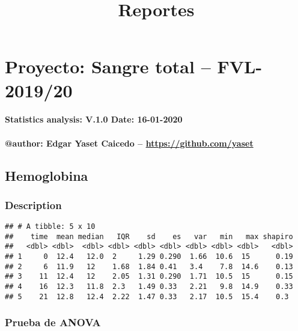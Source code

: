\documentclass[
]{article}
\title{Reportes}
\author{}
\date{\vspace{-2.5em}}
\begin{document}
\maketitle

\hypertarget{proyecto-sangre-total-fvl-201920}{%
\section{Proyecto: Sangre total --
FVL-2019/20}\label{proyecto-sangre-total-fvl-201920}}

\hypertarget{statistics-analysis-v.1.0-date-16-01-2020}{%
\paragraph{Statistics analysis: V.1.0 Date:
16-01-2020}\label{statistics-analysis-v.1.0-date-16-01-2020}}

\hypertarget{author-edgar-yaset-caicedo-httpsgithub.comyaset}{%
\paragraph{\texorpdfstring{@author: Edgar Yaset Caicedo --
\url{https://github.com/yaset}}{@author: Edgar Yaset Caicedo -- https://github.com/yaset}}\label{author-edgar-yaset-caicedo-httpsgithub.comyaset}}

\hypertarget{hemoglobina}{%
\subsection{Hemoglobina}\label{hemoglobina}}

\hypertarget{description}{%
\subsubsection{Description}\label{description}}

\begin{verbatim}
## # A tibble: 5 x 10
##    time  mean median   IQR    sd    es   var   min   max shapiro
##   <dbl> <dbl>  <dbl> <dbl> <dbl> <dbl> <dbl> <dbl> <dbl>   <dbl>
## 1     0  12.4   12.0  2     1.29 0.290  1.66  10.6  15      0.19
## 2     6  11.9   12    1.68  1.84 0.41   3.4    7.8  14.6    0.13
## 3    11  12.4   12    2.05  1.31 0.290  1.71  10.5  15      0.15
## 4    16  12.3   11.8  2.3   1.49 0.33   2.21   9.8  14.9    0.33
## 5    21  12.8   12.4  2.22  1.47 0.33   2.17  10.5  15.4    0.3
\end{verbatim}

\hypertarget{prueba-de-anova}{%
\subsubsection{Prueba de ANOVA}\label{prueba-de-anova}}
\end{document}
